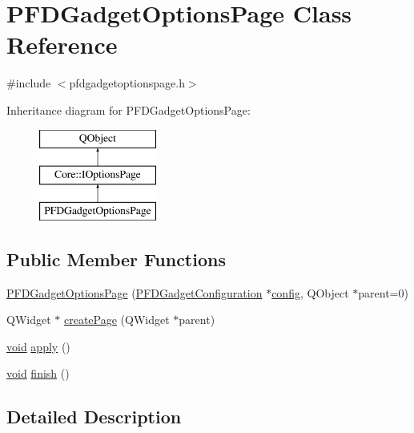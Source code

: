 \hypertarget{class_p_f_d_gadget_options_page}{\section{P\-F\-D\-Gadget\-Options\-Page Class Reference}
\label{class_p_f_d_gadget_options_page}
}


{\ttfamily \#include $<$pfdgadgetoptionspage.\-h$>$}

Inheritance diagram for P\-F\-D\-Gadget\-Options\-Page\-:\begin{figure}[H]
\begin{center}
\leavevmode
\includegraphics[height=3.000000cm]{class_p_f_d_gadget_options_page}
\end{center}
\end{figure}
\subsection*{Public Member Functions}
\begin{DoxyCompactItemize}
\item 
\hyperlink{group___o_p_map_plugin_ga788662fb7f7fe425c74e222930c5234f}{P\-F\-D\-Gadget\-Options\-Page} (\hyperlink{class_p_f_d_gadget_configuration}{P\-F\-D\-Gadget\-Configuration} $\ast$\hyperlink{deflate_8c_a4473b5227787415097004fd39f55185e}{config}, Q\-Object $\ast$parent=0)
\item 
Q\-Widget $\ast$ \hyperlink{group___o_p_map_plugin_gafa8be3bab1132cd2079a9610e594aa77}{create\-Page} (Q\-Widget $\ast$parent)
\item 
\hyperlink{group___u_a_v_objects_plugin_ga444cf2ff3f0ecbe028adce838d373f5c}{void} \hyperlink{group___o_p_map_plugin_gafd1965bb221fe257dbf056b8441b15aa}{apply} ()
\item 
\hyperlink{group___u_a_v_objects_plugin_ga444cf2ff3f0ecbe028adce838d373f5c}{void} \hyperlink{group___o_p_map_plugin_ga1edd62ccbcef9e6090a5b9061c5af34f}{finish} ()
\end{DoxyCompactItemize}


\subsection{Detailed Description}


